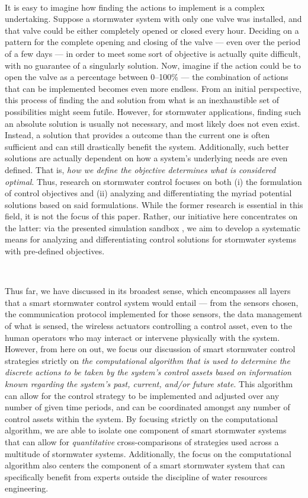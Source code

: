 \

It is easy to imagine how finding the  actions to implement is a complex undertaking. Suppose a stormwater system with only one valve was installed, and that valve could be either completely opened or closed every hour. Deciding on a pattern for the complete opening and closing of the valve --- even over the period of a few days --- in order to meet some sort of objective is actually quite difficult, with no guarantee of a singularly  solution. Now, imagine if the action could be to open the valve as a percentage between 0--100\% --- the combination of actions that can be implemented becomes even more endless. From an initial perspective, this process of finding the  and  solution from what is an inexhaustible set of possibilities might seem futile. However, for stormwater applications, finding such an absolute  solution is usually not necessary, and most likely does not even exist. Instead, a solution that provides a  outcome than the current one is often sufficient and can still drastically benefit the system. Additionally, such better solutions are actually dependent on how a system's underlying needs are even defined. That is, \emph{how we define the objective determines what is considered optimal}. Thus, research on stormwater control focuses on both (i) the formulation of control objectives and (ii) analyzing and differentiating the myriad potential solutions based on said formulations. While the former research is essential in this field, it is not the focus of this paper. Rather, our initiative here concentrates on the latter: via the presented simulation sandbox \pystormsNOSPACE, we aim to develop a systematic means for analyzing and differentiating control solutions for stormwater systems with pre-defined objectives.

\

Thus far, we have discussed  in its broadest sense, which encompasses all layers that a smart stormwater control system would entail --- from the sensors chosen, the communication protocol implemented for those sensors, the data management of what is sensed, the wireless actuators controlling a control asset, even to the human operators who may interact or intervene physically with the system. However, from here on out, we focus our discussion of smart stormwater control strategies strictly on \emph{the computational algorithm that is used to determine the discrete actions to be taken by the system's control assets based on information known regarding the system's past, current, and/or future state}. This algorithm can allow for the control strategy to be implemented and adjusted over any number of given time periods, and can be coordinated amongst any number of control assets within the system. By focusing strictly on the computational algorithm, we are able to isolate one component of smart stormwater systems that can allow for \emph{quantitative} cross-comparisons of strategies used across a multitude of stormwater systems. Additionally, the focus on the computational algorithm also centers the component of a smart stormwater system that can specifically benefit from experts outside the discipline of water resources engineering.
%
%
%
